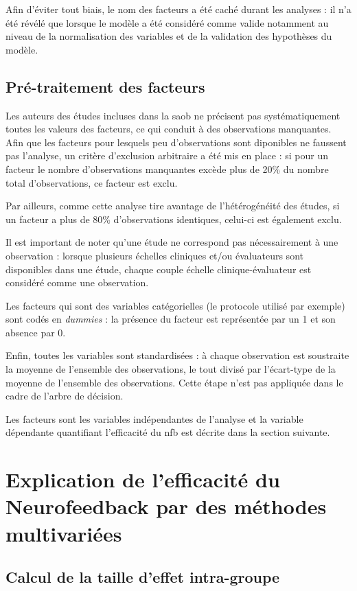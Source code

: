 Afin d'éviter tout biais, le nom des facteurs a été caché durant les analyses : il n'a été révélé que lorsque le modèle a été considéré comme valide notamment au niveau 
de la normalisation des variables et de la validation des hypothèses du modèle.  

\subsection{Pré-traitement des facteurs}

Les auteurs des études incluses dans la \gls{saob} ne précisent pas systématiquement toutes les valeurs des facteurs, ce qui conduit à des observations manquantes. Afin que 
les facteurs pour lesquels peu d'observations sont diponibles ne faussent pas l'analyse, un critère d'exclusion arbitraire a été mis en place : si pour un facteur le nombre d'observations 
manquantes excède plus de 20\% du nombre total d'observations, ce facteur est exclu. 

Par ailleurs, comme cette analyse tire avantage de l'hétérogénéité des études, si un facteur a plus de 80\% d'observations identiques, celui-ci est également exclu. 

Il est important de noter qu'une étude ne correspond pas nécessairement à une observation : lorsque plusieurs échelles cliniques et/ou évaluateurs sont disponibles dans une étude,
chaque couple échelle clinique-évaluateur est considéré comme une observation.

Les facteurs qui sont des variables catégorielles (le protocole utilisé par exemple) sont codés en \textit{dummies} : la présence du facteur est représentée par un 1 et son absence par 0. 

Enfin, toutes les variables sont standardisées : à chaque observation est soustraite la moyenne de l'ensemble des observations, le tout divisé par l'écart-type de la moyenne de 
l'ensemble des observations. Cette étape n'est pas appliquée dans le cadre de l'arbre de décision.

Les facteurs sont les variables indépendantes de l'analyse et la variable dépendante quantifiant l'efficacité du \gls{nfb} est décrite dans la section suivante.


\section{Explication de l'efficacité du Neurofeedback par des méthodes multivariées}

\subsection{Calcul de la taille d'effet intra-groupe}


